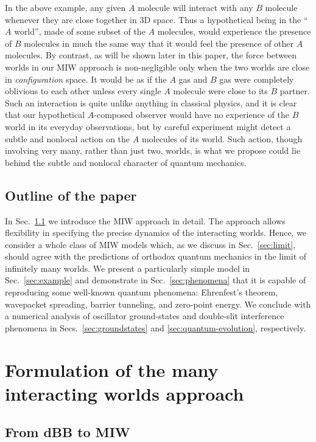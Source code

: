 \documentclass[12pt, aps,pra,amsmath,amssymb,superscriptaddress]{revtex4-2}
\renewcommand{\(}{\left(}
\renewcommand{\)}{\right)}
\newcommand{\blk}{\color{black}}
\begin{document}
 In the above example, any given $A$ molecule 
will interact with any $B$ molecule whenever they are close together in 
3D space. Thus a hypothetical being in the ``$A$ world'', 
made of some subset of the $A$ molecules, 
would experience the presence of $B$ molecules in much the same way that it would
feel the presence of other $A$ molecules.  By contrast, as will be shown later in this 
paper, the force between worlds in our MIW approach is non-negligible only when the 
two worlds are close in {\em configuration} space. It would be as if the $A$ gas 
and $B$ gas were completely oblivious to each other unless every single $A$ molecule 
were close to its $B$ partner. Such an interaction is quite unlike anything in classical 
physics, and it is clear that our hypothetical $A$-composed observer would have no 
experience of the $B$ world in its everyday observations, but by careful experiment 
might detect a subtle and nonlocal action on the $A$ molecules of its world. 
Such action, though involving very many, rather than just two, worlds, is what we propose could 
lie behind the subtle and nonlocal character of quantum mechanics. \blk

\subsection{Outline of the paper}

In Sec.~\ref{sec:MIW} we introduce the MIW approach in detail.  
The approach allows flexibility in specifying the precise dynamics of the interacting worlds. Hence,
we consider 
a whole class of MIW models which, as we discuss in Sec.~\ref{sec:limit},
should \blk agree with the predictions of orthodox \blk quantum mechanics in the
limit of infinitely many worlds.  We present a particularly simple model \blk in
Sec.~\ref{sec:example} and demonstrate in Sec.~\ref{sec:phenomena} that it is
capable of reproducing some \blk well-known quantum phenomena: Ehrenfest's \blk
theorem, wavepacket spreading, barrier tunneling, and zero-point energy. We
conclude with a numerical analysis of oscillator ground-states and double-slit
interference phenomena in Secs.~\ref{sec:groundstates} \blk and
\ref{sec:quantum-evolution}, respectively.\blk

\section{Formulation of the many interacting worlds approach}

\subsection{From dBB to MIW}\label{sec:MIW}
\end{document}
